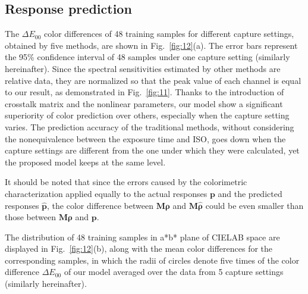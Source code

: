 \documentclass[9pt,twocolumn,twoside]{osajnl}
\begin{document}
	\subsection{Response prediction}\label{sec:response prediction}
	
	The $\Delta{}E_{00}$ color differences of 48 training samples for different capture settings, obtained by five methods, are shown in Fig.~\ref{fig:12}(a). The error bars represent the 95\% confidence interval of 48 samples under one capture setting (similarly hereinafter). Since the spectral sensitivities estimated by other methods are relative data, they are normalized so that the peak value of each channel is equal to our result, as demonstrated in Fig.~\ref{fig:11}. Thanks to the introduction of crosstalk matrix and the nonlinear parameters, our model show a significant superiority of color prediction over others, especially when the capture setting varies. The prediction accuracy of the traditional methods, without considering the nonequivalence between the exposure time and ISO, goes down when the capture settings are different from the one under which they were calculated, yet the proposed model keeps at the same level.
	
	It should be noted that since the errors caused by the colorimetric characterization applied equally to the actual responses $\mathbf{p}$ and the predicted responses $\hat{\mathbf{p}}$, the color difference between $\mathbf{M}\boldsymbol{\rho}$ and $\mathbf{M}\hat{\boldsymbol{\rho}}$ could be even smaller than those between $\mathbf{M}\boldsymbol{\rho}$ and $\mathbf{p}$.
	
	The distribution of 48 training samples in a*b* plane of CIELAB space are displayed in Fig.~\ref{fig:12}(b), along with the mean color differences for the corresponding samples, in which the radii of circles denote five times of the color difference $\Delta{}E_{00}$ of our model averaged over the data from 5 capture settings (similarly hereinafter).
	
\end{document}
